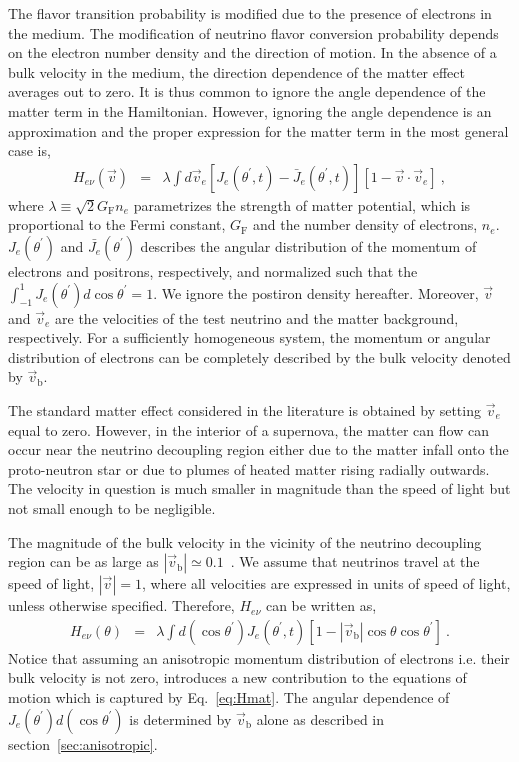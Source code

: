 \documentclass[aps, prd, 10pt, twocolumn, superscriptaddress, noshowpacs, preprintnumbers, longbibliography, groupedaddress, footinbib, bibnotes]{revtex4-1}
\newcommand{\vb}{\vec{v}_{\mathrm{b}}}
\newcommand{\denep}{J_{e}(\theta^\prime,t)}
\newcommand{\denepbar}{\bar{J}_{e}(\theta^\prime,t)}
\begin{document}
The flavor transition probability is modified due to the presence of electrons in the medium. The modification of neutrino flavor conversion probability depends on the electron number density and the direction of motion. In the absence of a bulk velocity in the medium, the direction dependence of the matter effect averages out to zero. It is thus common to ignore the angle dependence of the matter term in the Hamiltonian. 
However, ignoring the angle dependence is an approximation and the proper expression for the matter term in the most general case is,  
\begin{eqnarray}
\label{eq:Hmat_vdotv}
H_{e\nu}(\vec{v}) &=& 
 \lambda \int d\vec{v}_{e} \left[\denep - \denepbar \right] \left[1 - \vec{v} \cdot\vec{v}_{e} \right] \ ,
\end{eqnarray}
where $\lambda \equiv \sqrt{2} G_{\textrm{F}} n_{e}$ parametrizes the strength of matter potential, which is proportional to the Fermi constant, $G_{\textrm{F}}$ and the number density of electrons, $n_{e}$. $J_{e}(\theta^{\prime})$ and $\bar{J_{e}}(\theta^{\prime})$ describes the angular distribution of the momentum of electrons and positrons, respectively, and normalized such that the $\int_{-1}^{1}J_{e}(\theta^{\prime}) d\cos\theta^{\prime}=1$. We ignore the postiron density hereafter. Moreover, $\vec{v}$ and $\vec{v}_{e}$ are the velocities of the test neutrino and the matter background, respectively. For a sufficiently homogeneous system, the momentum or angular distribution of electrons can be completely described by the bulk velocity denoted by $\vb$. 

The standard matter effect considered in the literature is obtained by setting $\vec{v}_{e}$ equal to zero. 
However, in the interior of a supernova, the matter can flow can occur near the neutrino decoupling region either due to the matter infall onto the proto-neutron star or due to plumes of heated matter rising radially outwards. The velocity in question is much smaller in magnitude than the speed of light but not small enough to be negligible.

The magnitude of the bulk velocity in the vicinity of the neutrino decoupling region can be as large as  $|\vb| \simeq 0.1$~\cite{Just:2018djz}. We assume that neutrinos travel at the speed of light, $|\vec{v}| = 1$, where all velocities are expressed in units of speed of light, unless otherwise specified. Therefore, $H_{e\nu}$ can be written as,
\begin{eqnarray}
\label{eq:Hmat}
H_{e\nu}(\theta) &=& \lambda \int d (\cos{\theta^\prime}) \denep  \left[1 - |\vb| \cos{\theta}\cos{\theta^{\prime}} \right]\ .
\end{eqnarray}
Notice that assuming an anisotropic momentum distribution of electrons i.e. their bulk velocity is not zero, introduces a new contribution to the equations of motion which is captured by Eq.~\ref{eq:Hmat}. The angular dependence of $J_{e}(\theta^{\prime}) d(\cos{\theta^{\prime}})$ is determined by $\vb$ alone as described in section~\ref{sec:anisotropic}.
\end{document}
